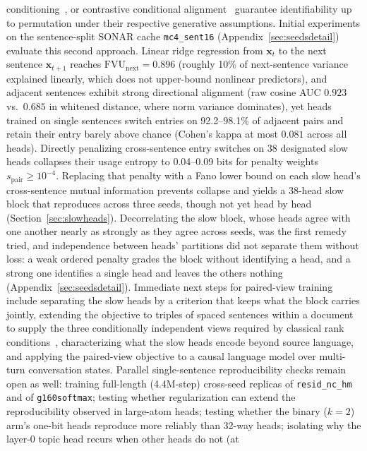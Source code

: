 \begin{itemize}
conditioning~\cite{ivae2020}, or contrastive conditional
alignment~\cite{zimmermann2021} guarantee identifiability up to
permutation under their respective generative assumptions. Initial
experiments on the sentence-split SONAR cache \texttt{mc4\_sent16}
(Appendix~\ref{sec:seedsdetail}) evaluate this second approach. Linear
ridge regression from $\mathbf{x}_t$ to the next sentence
$\mathbf{x}_{t+1}$ reaches $\mathrm{FVU}_{\mathrm{next}}{=}0.896$
(roughly 10\% of next-sentence variance explained linearly, which does
not upper-bound nonlinear predictors), and adjacent sentences exhibit
strong directional alignment (raw cosine AUC $0.923$ vs.\ $0.685$ in
whitened distance, where norm variance dominates), yet heads trained on
single sentences switch entries on 92.2--98.1\% of adjacent pairs and
retain their entry barely above chance (Cohen's kappa at most $0.081$
across all heads). Directly penalizing cross-sentence entry switches on
38 designated slow heads collapses their usage entropy to 0.04--0.09 bits
for penalty weights $s_{\mathrm{pair}} \ge 10^{-4}$. Replacing that
penalty with a Fano lower bound on each slow head's cross-sentence mutual
information prevents collapse and yields a 38-head slow block that
reproduces across three seeds, though not yet head by head
(Section~\ref{sec:slowheads}). Decorrelating the slow block, whose heads
agree with one another nearly as strongly as they agree across seeds,
was the first remedy tried, and independence between heads' partitions
did not separate them without loss: a weak ordered penalty grades the block
without identifying a head, and a strong one identifies a single head
and leaves the others nothing (Appendix~\ref{sec:seedsdetail}).
Immediate next steps for paired-view training include separating the
slow heads by a criterion that keeps what the block carries jointly,
extending the objective to triples of spaced sentences within a document
to supply the three conditionally independent views required by classical
rank conditions~\cite{allman2009}, characterizing what the slow heads
encode beyond source language, and applying the paired-view objective to a
causal language model over multi-turn conversation states. Parallel
single-sentence reproducibility checks remain open as well: training
full-length (4.4M-step) cross-seed replicas of \texttt{resid\_nc\_hm} and
of \texttt{g160softmax}; testing whether regularization can extend the
reproducibility observed in large-atom heads; testing whether the binary
($k{=}2$) arm's one-bit heads reproduce more reliably than 32-way heads;
isolating why the layer-0 topic head recurs when other heads do not (at

\end{itemize}
